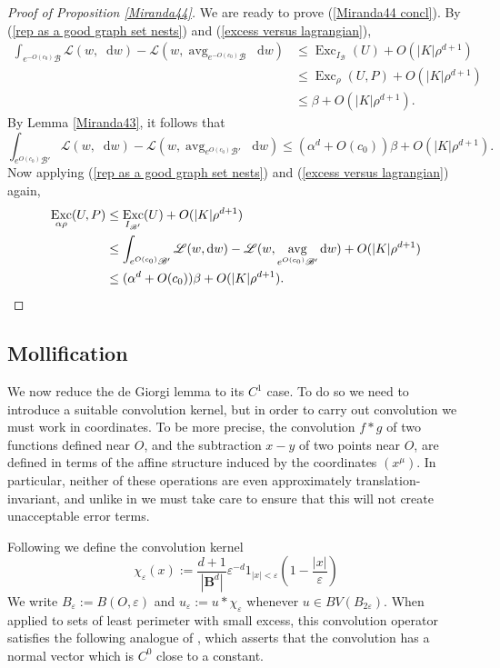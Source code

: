 \documentclass[final,12pt, leqno]{brownthesis}
\newcommand{\Ball}{\mathbf{B}}
\DeclareMathOperator{\avg}{avg}
\DeclareMathOperator{\Exc}{Exc}
\newcommand*\dif{\mathop{}\!\mathrm{d}}
\newcommand{\Lagrange}{\mathscr L}
\theoremstyle{definition}
\numberwithin{equation}{section}
\begin{document}
\begin{proof}[Proof of Proposition \ref{Miranda44}]
We are ready to prove (\ref{Miranda44 concl}).
By (\ref{rep as a good graph set nests}) and (\ref{excess versus lagrangian}),
\begin{align*}
\int_{e^{-O(c_0)} \mathscr B} \Lagrange(w, \dif w) - \Lagrange(w, \avg_{e^{-O(c_0)} \mathscr B} \dif w)
&\leq \Exc_{I_{\mathscr B}}(U) + O(|K| \rho^{d + 1}) \\
&\leq \Exc_\rho(U, P) + O(|K| \rho^{d + 1}) \\
&\leq \beta + O(|K| \rho^{d + 1}).
\end{align*}
By Lemma \ref{Miranda43}, it follows that
$$\int_{e^{O(c_0)} \mathscr B'} \Lagrange(w, \dif w) - \Lagrange(w, \avg_{e^{O(c_0)} \mathscr B'} \dif w) \leq (\alpha^d + O(c_0)) \beta + O(|K| \rho^{d + 1}).$$
Now applying (\ref{rep as a good graph set nests}) and (\ref{excess versus lagrangian}) again,
\begin{align*}
\Exc_{\alpha \rho}(U, P)
&\leq \Exc_{I_{\mathscr B'}}(U) + O(|K| \rho^{d + 1}) \\
&\leq \int_{e^{O(c_0)} \mathscr B'} \Lagrange(w, \dif w) - \Lagrange(w, \avg_{e^{O(c_0)} \mathscr B'} \dif w) + O(|K| \rho^{d + 1}) \\
&\leq (\alpha^d + O(c_0)) \beta + O(|K| \rho^{d + 1}). \qedhere
\end{align*}
\end{proof}

\subsection{Mollification}
We now reduce the de Giorgi lemma to its $C^1$ case.
To do so we need to introduce a suitable convolution kernel, but in order to carry out convolution we must work in coordinates.
To be more precise, the convolution $f * g$ of two functions defined near $O$, and the subtraction $x - y$ of two points near $O$, are defined in terms of the affine structure induced by the coordinates $(x^\mu)$.
In particular, neither of these operations are even approximately translation-invariant, and unlike in \cite{Giusti77} we must take care to ensure that this will not create unacceptable error terms.

Following \cite[Chapter 7]{Giusti77} we define the convolution kernel
$$\chi_\varepsilon(x) := \frac{d + 1}{|\Ball^d|} \varepsilon^{-d}1_{|x| < \varepsilon} \left(1 - \frac{|x|}{\varepsilon}\right)$$
We write $B_\varepsilon := B(O, \varepsilon)$ and $u_\varepsilon := u * \chi_\varepsilon$ whenever $u \in BV(B_{2\varepsilon})$.
When applied to sets of least perimeter with small excess, this convolution operator satisfies the following analogue of \cite[Theorem 7.3]{Giusti77}, which asserts that the convolution has a normal vector which is $C^0$ close to a constant.
\end{document}
